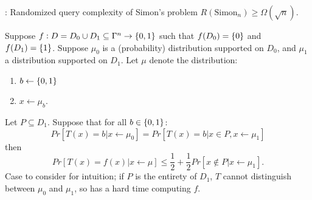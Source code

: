 \begin{propbox}{: Randomized query complexity of Simon's problem}
    $R(\text{Simon}_n) \geq \Omega(\sqrt{n})$.
\end{propbox}

\begin{lembox}{}
    Suppose $f: D = D_0 \cup D_1 \subseteq \Gamma^n \to \set{0, 1}$ such that $f(D_0) = \set{0}$ and $f(D_1) = \set{1}$. Suppose $\mu_0$ is a (probability) distribution supported on $D_0$, and $\mu_1$ a distribution supported on $D_1$. Let $\mu$ denote the distribution:
    \begin{enumerate}
        \item $b \leftarrow \set{0, 1}$
        \item $x \leftarrow \mu_b$. 
    \end{enumerate}
    Let $P \subseteq D_1$. Suppose that for all $b \in \set{0, 1}$:
    \begin{equation}
        Pr[T(x) = b \vert x \leftarrow \mu_0] = Pr[T(x) = b \vert x \in P, x \leftarrow \mu_1]
    \end{equation}
    then
    \begin{equation}
        Pr[T(x) = f(x) \vert x \leftarrow \mu] \leq \frac{1}{2} + \frac{1}{2}Pr[x \notin P \vert x \leftarrow \mu_1].
    \end{equation}
    Case to consider for intuition; if $P$ is the entirety of $D_1$, $T$ cannot distinguish between $\mu_0$ and $\mu_1$, so has a hard time computing $f$. 
\end{lembox}